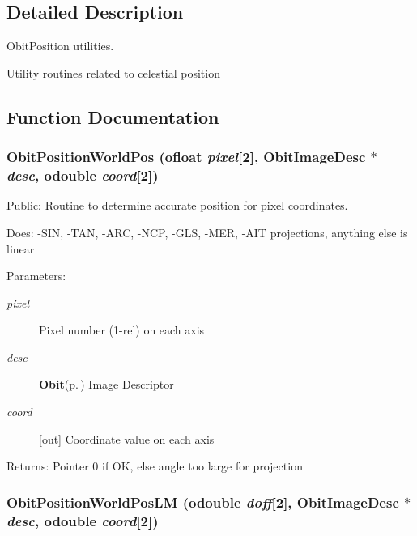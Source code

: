 \subsection{Detailed Description}
Obit\-Position utilities. 

Utility routines related to celestial position

\subsection{Function Documentation}
\subsubsection{ Obit\-Position\-World\-Pos ({\bf ofloat} {\em pixel}[2], {\bf Obit\-Image\-Desc} $\ast$ {\em desc}, {\bf odouble} {\em coord}[2])}\label{ObitPosition_8h_a0}


Public: Routine to determine accurate position for pixel coordinates. 

Does: -SIN, -TAN, -ARC, -NCP, -GLS, -MER, -AIT projections, anything else is linear

\begin{Desc}
\item[Parameters:]
\begin{description}
\item[{\em pixel}]Pixel number (1-rel) on each axis \item[{\em desc}]{\bf Obit}{\rm (p.\,\pageref{structObit})} Image Descriptor \item[{\em coord}][out] Coordinate value on each axis \end{description}
\end{Desc}
\begin{Desc}
\item[Returns:]Pointer 0 if OK, else angle too large for projection \end{Desc}
\subsubsection{ Obit\-Position\-World\-Pos\-LM ({\bf odouble} {\em doff}[2], {\bf Obit\-Image\-Desc} $\ast$ {\em desc}, {\bf odouble} {\em coord}[2])}\label{ObitPosition_8h_a2}


